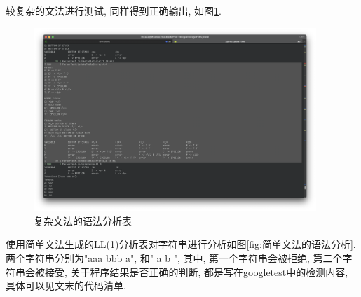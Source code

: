 较复杂的文法进行测试, 同样得到正确输出, 如图\ref{fig:复杂文法的语法分析表}.


\begin{figure}[ht!]
	\begin{center}
		\includegraphics[width=0.95\textwidth]{figures/ll1分析表2.png}
	\end{center}
	\caption{复杂文法的语法分析表}
	\label{fig:复杂文法的语法分析表}
\end{figure}

使用简单文法生成的LL(1)分析表对字符串进行分析如图\ref{fig:简单文法的语法分析}. 两个字符串分别为"aaa bbb a", 和"   a
b   ", 其中, 第一个字符串会被拒绝, 第二个字符串会被接受,
关于程序结果是否正确的判断, 都是写在googletest中的检测内容, 具体可以见文末的代码清单.

